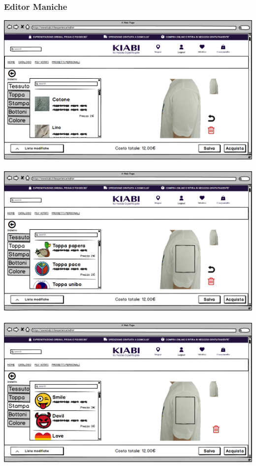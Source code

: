\documentclass[12pt,italian,]{report}
\begin{document}
\subsubsection{Editor Maniche} 
\includegraphics{balsamiq/Editor - caratteristica maniche tessuto.png}
\\
\\
\includegraphics{balsamiq/Editor - caratteristica maniche toppa.png}
\\
\\
\includegraphics{balsamiq/Editor - caratteristica maniche stampa.png}
\end{document}
